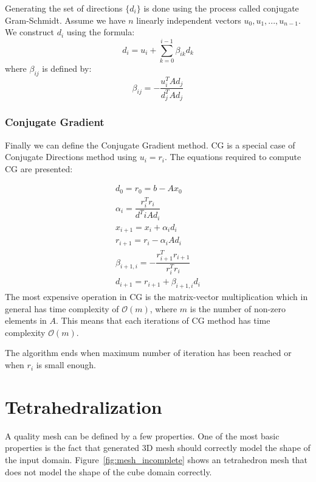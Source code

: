 \documentclass[en]{minipw} %
\begin{document}
Generating the set of directions $\{ d_i \}$ is done using the process called conjugate Gram-Schmidt. Assume we have $n$ linearly independent vectors $u_0, u_1, ..., u_{n-1}$. We construct $d_i$ using the formula:
\begin{equation}
d_{i} = u_{i} + \sum^{i-1}_{k=0} \beta_{ik} d_{k}
\end{equation}
where $\beta_{ij}$ is defined by:
\begin{equation}
\beta_{ij} = - \dfrac{u^{T}_i A d_{j}}{d^{T}_{j}A d_{j}}
\end{equation}

\subsection{Conjugate Gradient}
Finally we can define the Conjugate Gradient method. CG is a special case of Conjugate Directions method using $u_i = r_i$. The equations required to compute CG are presented:

\begin{equation}
\begin{aligned}
d_0 = r_0 = b - Ax_0
\\
\alpha_i = \dfrac{r^{T}_{i} r_{i}}{d^{T}{i} A d_{i}}
\\
x_{i+1} = x_{i} + \alpha_{i}d_{i}
\\
r_{i+1} = r_{i} - \alpha_{i}Ad_{i}
\\
\beta_{i+1,i} = - \dfrac{r^{T}_{i+1} r_{i+1}}{r^{T}_{i} r_{i}}
\\
d_{i+1} = r_{i+1} + \beta_{i+1,i} d_{i}
\end{aligned}
\end{equation}
The most expensive operation in CG is the matrix-vector multiplication which in general has time complexity of $\mathcal{O}(m)$, where $m$ is the number of non-zero elements in $A$. This means that each iterations of CG method has time complexity $\mathcal{O}(m)$.

The algorithm ends when maximum number of iteration has been reached or when $r_i$ is small enough.

\chapter{Tetrahedralization}
\label{chap:Tetrahedralization}

A quality mesh can be defined by a few properties.
One of the most basic properties is the fact that generated 3D mesh should correctly model the shape of the input domain. Figure~\ref{fig:mesh_incomplete} shows an tetrahedron mesh that does not model the shape of the cube domain correctly.
\end{document}
